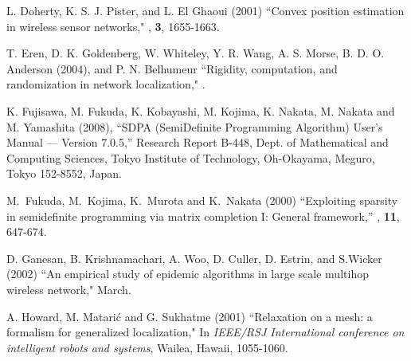 \documentclass[12pt]{article}
\begin{document}
\begin{thebibliography}{99}
 L. Doherty, K. S. J. Pister, and L. El Ghaoui (2001)
\newblock ``Convex position estimation in wireless sensor networks,"
, {\bf 3}, 1655-1663.

 T. Eren, D. K. Goldenberg, W. Whiteley, Y. R. Wang, A. S. Morse, B. D. O. Anderson (2004),
and P. N. Belhumeur 
\newblock ``Rigidity, computation, and randomization in network localization," 
.
 
 

K. Fujisawa, M. Fukuda, K. Kobayashi, M. Kojima, K. Nakata, M. Nakata and M. Yamashita 
(2008), 
\newblock ``SDPA (SemiDefinite Programming Algorithm) User's Manual --- Version 7.0.5,'' 
\newblock Research Report B-448, Dept. of Mathematical and
Computing Sciences, Tokyo Institute of Technology, Oh-Okayama,
Meguro, Tokyo 152-8552, Japan.


M.~Fukuda, M.~Kojima, K.~Murota and K.~Nakata (2000)
\newblock ``Exploiting sparsity in semidefinite programming via matrix completion I: General framework,''
,  {\bf 11}, 647-674.

 D. Ganesan, B. Krishnamachari, A. Woo, D. Culler, D. Estrin, and S.Wicker (2002)
\newblock ``An empirical study of epidemic algorithms in large scale multihop wireless network," March.
 
%

 A. Howard, M. Matari\'{c} and G. Sukhatme (2001)
\newblock ``Relaxation on a mesh: a formalism for generalized localization,"
\newblock In {\em IEEE/RSJ International conference on intelligent robots and systems},
Wailea, Hawaii, 1055-1060.


\end{thebibliography}
\end{document}
